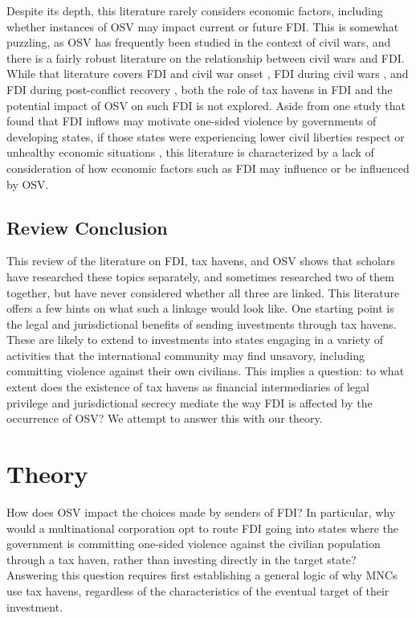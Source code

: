 \documentclass[11pt, titlepage]{article} %
\begin{document}
Despite its depth, this literature rarely considers economic factors, including whether instances of OSV may impact current or future FDI. This is somewhat puzzling, as OSV has frequently been studied in the context of civil wars, and there is a fairly robust literature on the relationship between civil wars and FDI. While that literature covers FDI and civil war onset \parencite{bussmann2007globalization, sorens2014globalisation, mihalache2018whose}, FDI during civil wars \parencite{Asiedu2006,jensen2006,jensenyoung2008,bussmann2010,livashchilko2010, Wittetal2017, OhOetzel2017,barry2018}, and FDI during post-conflict recovery \parencite{allee2010, billing2019,bak2021intrastate}, both the role of tax havens in FDI and the potential impact of OSV on such FDI is not explored. Aside from one study that found that FDI inflows may motivate one-sided violence by governments of developing states, if those states were experiencing lower civil liberties respect or unhealthy economic situations \parencite{kishi2017foreign}, this literature is characterized by a lack of consideration of how economic factors such as FDI may influence or be influenced by OSV. 

\subsection*{Review Conclusion}

This review of the literature on FDI, tax havens, and OSV shows that scholars have researched these topics separately, and sometimes researched two of them together, but have never considered whether all three are linked. This literature offers a few hints on what such a linkage would look like. One starting point is the legal and jurisdictional benefits of sending investments through tax havens. These are likely to extend to investments into states engaging in a variety of activities that the international community may find unsavory, including committing violence against their own civilians. This implies a question: to what extent does the existence of tax havens as financial intermediaries of legal privilege and jurisdictional secrecy mediate the way FDI is affected by the occurrence of OSV? We attempt to answer this with our theory.


\section*{Theory}

How does OSV impact the choices made by senders of FDI? In particular, why would a multinational corporation opt to route FDI going into states where the government is committing one-sided violence against the civilian population through a tax haven, rather than investing directly in the target state? Answering this question requires first establishing a general logic of why MNCs use tax havens, regardless of the characteristics of the eventual target of their investment.
\end{document}
